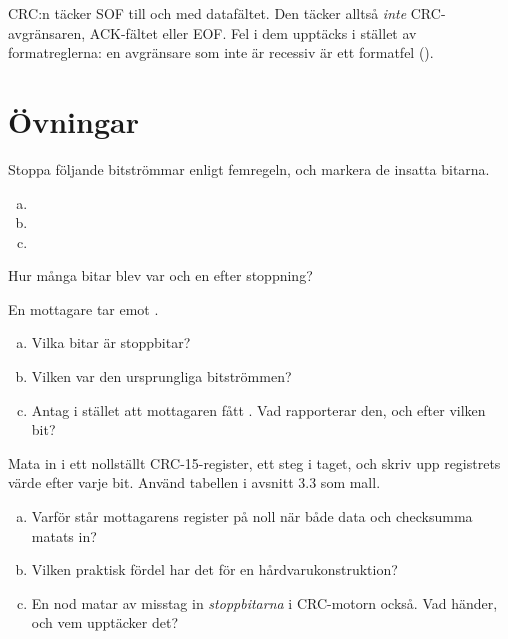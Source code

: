 CRC:n täcker SOF till och med datafältet. Den täcker alltså \emph{inte} CRC-avgränsaren,
ACK-fältet eller EOF. Fel i dem upptäcks i stället av formatreglerna: en avgränsare som inte är
recessiv är ett formatfel ().

\section*{Övningar}

\label{ex:3:1}
Stoppa följande bitströmmar enligt femregeln, och markera de insatta bitarna.
\begin{enumerate}[a)]
  \item {}
  \item {}
  \item {}
\end{enumerate}
Hur många bitar blev var och en efter stoppning?

\label{ex:3:2}
En mottagare tar emot .
\begin{enumerate}[a)]
  \item Vilka bitar är stoppbitar?
  \item Vilken var den ursprungliga bitströmmen?
  \item Antag i stället att mottagaren fått . Vad rapporterar den, och efter
    vilken bit?
\end{enumerate}

\label{ex:3:3}
Mata in  i ett nollställt CRC-15-register, ett steg i taget, och skriv upp registrets
värde efter varje bit. Använd tabellen i avsnitt 3.3 som mall.

\label{ex:3:4}
\begin{enumerate}[a)]
  \item Varför står mottagarens register på noll när både data och checksumma matats in?
  \item Vilken praktisk fördel har det för en hårdvarukonstruktion?
  \item En nod matar av misstag in \emph{stoppbitarna} i CRC-motorn också. Vad händer, och vem
    upptäcker det?
\end{enumerate}
